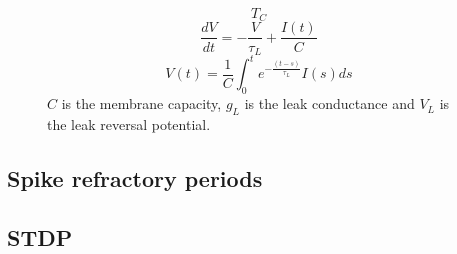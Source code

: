 


\begin{figure}[h]
    \centering
    \begin{equation}\label{eq:LIF_TC}
        T_C
    \end{equation}
    \begin{equation}\label{eq:LIF_RC}
        \frac{d V}{d t} = -\frac{V}{\tau_L} + \frac{I(t)}{C}
    \end{equation}
    \begin{equation}\label{eq:integ_LIF_RC_VL}
        V(t)= \frac{1}{C} \int_{0}^{t} e^{-\frac{(t-s)}{\tau_L}} I(s) ds
    \end{equation}
    $C$ is the membrane capacity, $g_L$ is the leak conductance and $V_L$ is the leak reversal potential.
    \label{LIFequation}
\end{figure}

\subsection{Spike refractory periods}

\subsection{STDP}